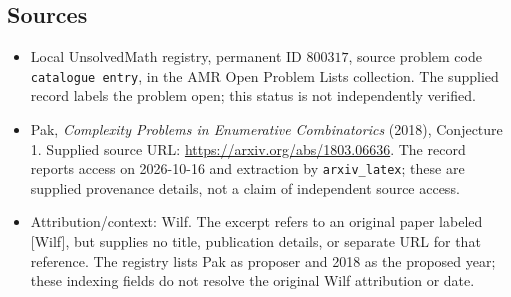 \documentclass[11pt]{article}
\begin{document}
\subsection{Sources}
\begin{itemize}
\item Local UnsolvedMath registry, permanent ID \(800317\), source problem code \texttt{catalogue entry}, in the AMR Open Problem Lists collection. The supplied record labels the problem open; this status is not independently verified.
\item Pak, \emph{Complexity Problems in Enumerative Combinatorics} (2018), Conjecture 1. Supplied source URL: \url{https://arxiv.org/abs/1803.06636}. The record reports access on 2026-10-16 and extraction by \texttt{arxiv\_latex}; these are supplied provenance details, not a claim of independent source access.
\item Attribution/context: Wilf. The excerpt refers to an original paper labeled [Wilf], but supplies no title, publication details, or separate URL for that reference. The registry lists Pak as proposer and 2018 as the proposed year; these indexing fields do not resolve the original Wilf attribution or date.
\end{itemize}
\end{document}
